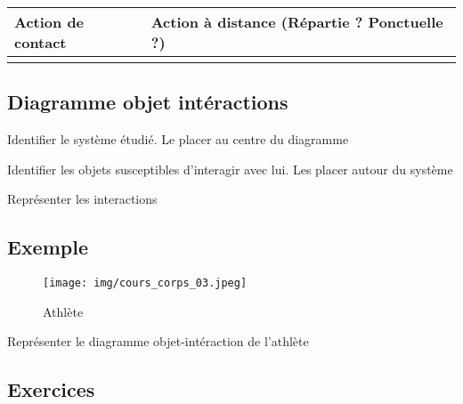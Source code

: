\documentclass[a4paper,12pt]{article}
\begin{document}
  \begin{center}
    \renewcommand{\arraystretch}{2} %
    \begin{tabularx}{\textwidth}{|>{\centering\arraybackslash}X|>{\centering\arraybackslash}X|}
      \hline
      \textbf{Action de contact} & \textbf{Action à distance (Répartie ? Ponctuelle ?)} \\
      \hline
      \rule{0pt}{16em} & \rule{0pt}{16em} \\ %
      \hline
    \end{tabularx}
  \end{center}

  \subsection*{Diagramme objet intéractions}

  \vspace{10em}


  \begin{tcolorbox}[colback=green!10!white, colframe=green!75!black, title=Méthode]
    \begin{compactitem}
      \item Identifier le système étudié. Le placer au centre du diagramme
      \item Identifier les objets susceptibles d'interagir avec lui. Les placer autour du système 
      \item Représenter les interactions
    \end{compactitem}
  \end{tcolorbox}

  \subsection*{Exemple}

  \begin{figure}[H]
    \centering
    \texttt{[image: img/cours\_corps\_03.jpeg]}
    \caption{\label{} Athlète}
  \end{figure}

  Représenter le diagramme objet-intéraction de l'athlète

  \vspace{10em}

\subsection*{Exercices}
\end{document}
